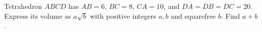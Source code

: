 Tetrahedron $ABCD$ has $AB=6$, $BC=8$, $CA=10$, and $DA=DB=DC=20$. Express its volume as $a\sqrt b$ with positive integers $a,b$ and squarefree $b$. Find $a+b$.
